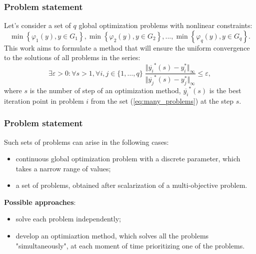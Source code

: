 \documentclass[aspectratio=1610]{beamer}
\begin{document}
\begin{frame}
  \frametitle{Problem statement}
  Let's consider a set of \(q\) global optimization problems with nonlinear constraints:
  \begin{equation}
    \label{eq:many_problems}
    \min\left\{\varphi_1(y), y\in G_1 \right\}, \min\left\{\varphi_2(y), y\in G_2\right\},...,
  \min\left\{\varphi_q(y), y\in G_q\right\}.
  \end{equation}
  This work aims to formulate a method that will ensure the uniform convergence to the
  solutions of all problems in the series:
  \begin{equation}
    \exists \varepsilon > 0: \forall s>1, \forall i,j\in\{1,\dots,q\}\;
      \frac{\Vert \overline{y_i}^*(s) - y_i^*\Vert_\infty}{\Vert \overline{y_j}^*(s) - y_j^*\Vert_	\infty} \leqslant \varepsilon,
  \end{equation}
  where \(s\) is the number of step of an optimization method, \(\overline{y_i}^*(s)\) is the best iteration point
  in problem \(i\) from the set (\ref{eq:many_problems}) at the step \(s\).

\end{frame}

\begin{frame}
  \frametitle{Problem statement}
  Such sets of problems can arise in the following cases:
  \begin{itemize}
    \item continuous global optimization problem with a discrete parameter, which takes a narrow range of values;
    \item a set of problems, obtained after scalarization of a multi-objective problem.
  \end{itemize}
\textbf{Possible approaches}:
  \begin{itemize}
    \item solve each problem independently;
    \item develop an optimiaztion method, which solves all the problems "simultaneously", at each moment of time
    prioritizing one of the problems.
  \end{itemize}
\end{frame}
\end{document}
